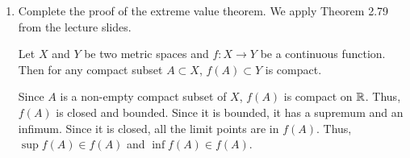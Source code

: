 \begin{enumerate}
\begin{proof}
\begin{proof}
	\[ [0,y]\subseteq U_{x_1}\cup U_{x_2}\cup\cdots\cup U_{x_n}\cup U_x \]
	and hence \(y\in S\).
	So for each \(x\in[0,1]\), \(U_x\cap S=U_x\) or \(U_x\cap S=\varnothing\).
	This implies that
	\[ S=\bigcup_{x\in S} U_x \quad\textrm{and}\quad [0,1]\backslash S=\bigcup_{x\notin S} U_x \]
	Thus we have that $S$ is open in \([0,1]\).
	But \([0,1]\) is connected.
	Therefore, \(S=[0,1]\) or \(S=\varnothing\).
	However, \(0\in S\), and so \(S=[0,1]\).
	That means \([0,1]\) can be covered by finite number of $U_x$, so
	\[ [0,1]\subseteq U_{x_1}\cup U_{x_2}\cup\cdots\cup U_{x_m} \]
	But each \(U_{x_i}\) is contained in an \(O_i,i\in I\).
	Hence,
	\[ [0,1]\subseteq O_{i_1}\cup O_{i_2}\cup\cdots\cup O_{i_m} \]
	and we have shown that \([0,1]\) is compact, which indicates all the closed intervals \([a,b]\) are compact.
    As \([a,b]\) is compact and $A$ is a closed subset, $A$ is compact.
    \end{proof}
    \end{proof}
    \item Complete the proof of the extreme value theorem.
	We apply Theorem 2.79 from the lecture slides.
	\begin{theorem}
	Let $X$ and $Y$ be two metric spaces and \(f:X\to Y\) be a continuous function.
	Then for any compact subset \(A\subset X\), \(f(A)\subset Y\) is compact.
	\end{theorem}
	Since $A$ is a non-empty compact subset of $X$, \(f(A)\) is compact on $\mathbb{R}$.
	Thus, \(f(A)\) is closed and bounded.
	Since it is bounded, it has a supremum and an infimum.
	Since it is closed, all the limit points are in \(f(A)\).
	Thus, \(\sup f(A)\in f(A)\) and \(\inf f(A)\in f(A)\).
\end{enumerate}


